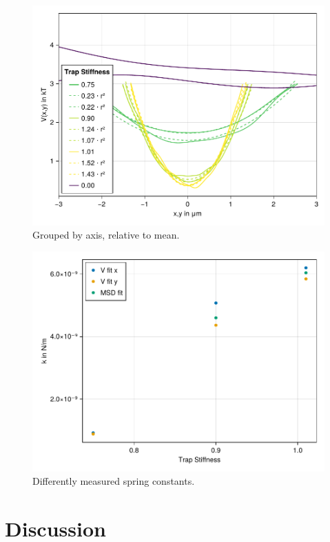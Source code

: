 \documentclass[
    parskip=half, 
    twoside=false,
    twocolumn=true,
    fontsize=11pt,
]{scrarticle}
\begin{document}
\begin{figure}
    \centering
    \includegraphics{figures/01_03_3_axis.pdf}
    \caption{Grouped by axis, relative to mean.}
\end{figure}

\begin{figure}
    \centering
    \includegraphics{figures/01_03_4_spring_constants.pdf}
    \caption{Differently measured spring constants.}
\end{figure}

\pagebreak
\section{Discussion}
\end{document}
